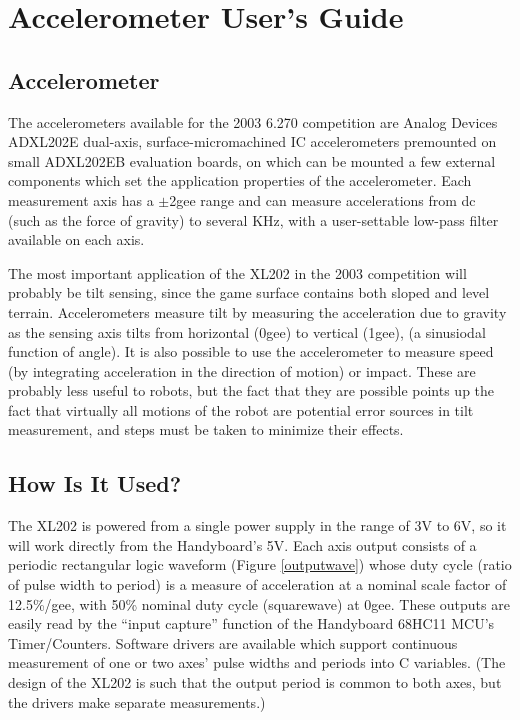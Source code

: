 
\chapter{Accelerometer User's Guide}

\section{Accelerometer}

The accelerometers available for the 2003 6.270 competition are Analog
Devices ADXL202E dual-axis, surface-micromachined IC accelerometers
premounted on small ADXL202EB evaluation boards, on which can be
mounted a few external components which set the application properties
of the accelerometer.  Each measurement axis has a $\pm$2gee range and
can measure accelerations from dc (such as the force of gravity) to
several KHz, with a user-settable low-pass filter available on each
axis.

The most important application of the XL202 in the 2003 competition
will probably be tilt sensing, since the game surface contains both
sloped and level terrain. Accelerometers measure tilt by measuring the
acceleration due to gravity as the sensing axis tilts from horizontal
(0gee) to vertical (1gee), (a sinusiodal function of angle).  It is
also possible to use the accelerometer to measure speed (by
integrating acceleration in the direction of motion) or impact.  These
are probably less useful to robots, but the fact that they are
possible points up the fact that virtually all motions of the robot
are potential error sources in tilt measurement, and steps must be
taken to minimize their effects.

\section{How Is It Used?}

The XL202 is powered from a single power supply in the range of 3V to
6V, so it will work directly from the Handyboard's 5V.  Each axis
output consists of a periodic rectangular logic waveform (Figure
\ref{outputwave}) 
whose duty cycle (ratio of pulse width to period) is a measure of
acceleration at a nominal scale factor of 12.5\%/gee, with 50\% nominal
duty cycle (squarewave) at 0gee.  These outputs are easily read by the
``input capture'' function of the Handyboard 68HC11 MCU's
Timer/Counters.  Software drivers are available which support
continuous measurement of one or two axes' pulse widths and periods
into C variables.  (The design of the XL202 is such that the output
period is common to both axes, but the drivers make separate
measurements.)


